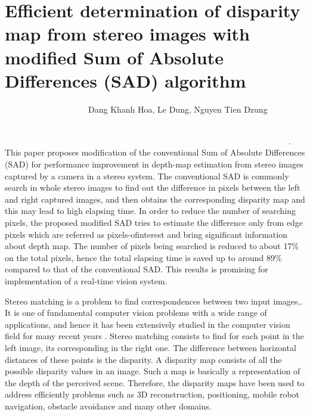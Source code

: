 
\chapter{Efficient determination of disparity map from
stereo images with modified Sum of Absolute
Differences (SAD) algorithm}

\ \ \ \ \ \ \ \ \ \ \ \ \ \ \ \ \ \ \ \ Dang Khanh Hoa, Le Dung, Nguyen Tien Dzung

\ \ \ \ \ \ \ \ \ \ \ \ \ \ \ \ \ \ \ \ \ \ \ \ \ \ \ \ \ \ \ \ \ \ \ \ \ \ \ \ \ \ \ \ \ \ \ \ \ \ \ \ \ \ \ \ \ \ \ \ \ \ \ \ \ \ \ \ \ \ \ \ \ \ \ \ \ \ \ \ \ \ \ \ \ \ \ \ \ \ \ \ \ \ \ \ \ \ \ \ \ \ \ \ \ \ \ \ \ \ \ \ \ \ \ \ \ \ \ \ \ \ \ \ \ \ \ \ \ \ \ \ \ \ \ \ \ \ \ \ .\\

This paper proposes modification of the
conventional Sum of Absolute Differences (SAD) for performance
improvement in depth-map estimation from stereo images
captured by a camera in a stereo system. The conventional SAD
is commonly search in whole stereo images to find out the
difference in pixels between the left and right captured images,
and then obtains the corresponding disparity map and this may
lead to high elapsing time. In order to reduce the number of
searching pixels, the proposed modified SAD tries to estimate the
difference only from edge pixels which are referred as pixels-ofinterest
and bring significant information about depth map. The
number of pixels being searched is reduced to about 17\% on the
total pixels, hence the total elapsing time is saved up to around
89\% compared to that of the conventional SAD. This results is
promising for implementation of a real-time vision system.

Stereo matching is a problem to find correspondences
between two input images,. It is one of fundamental
computer vision problems with a wide range of applications,
and hence it has been extensively studied in the computer
vision field for many recent years . Stereo matching consists to
find for each point in the left image, its corresponding in the
right one. The difference between horizontal distances of these
points is the disparity. A disparity map consists of all the
possible disparity values in an image. Such a map is basically
a representation of the depth of the perceived scene. Therefore,
the disparity maps have been used to address efficiently
problems such as 3D reconstruction, positioning, mobile robot
navigation, obstacle avoidance and many other domains.


